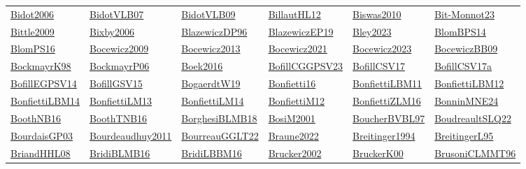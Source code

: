 \begin{longtable}{*{6}{l}}
\hyperref[detail:Bidot2006]{Bidot2006} & \hyperref[detail:BidotVLB07]{BidotVLB07} & \hyperref[detail:BidotVLB09]{BidotVLB09} & \hyperref[detail:BillautHL12]{BillautHL12} & \hyperref[detail:Biswas2010]{Biswas2010} & \hyperref[detail:Bit-Monnot23]{Bit-Monnot23}\\ 
\hyperref[detail:Bittle2009]{Bittle2009} & \hyperref[detail:Bixby2006]{Bixby2006} & \hyperref[detail:BlazewiczDP96]{BlazewiczDP96} & \hyperref[detail:BlazewiczEP19]{BlazewiczEP19} & \hyperref[detail:Bley2023]{Bley2023} & \hyperref[detail:BlomBPS14]{BlomBPS14}\\ 
\hyperref[detail:BlomPS16]{BlomPS16} & \hyperref[detail:Bocewicz2009]{Bocewicz2009} & \hyperref[detail:Bocewicz2013]{Bocewicz2013} & \hyperref[detail:Bocewicz2021]{Bocewicz2021} & \hyperref[detail:Bocewicz2023]{Bocewicz2023} & \hyperref[detail:BocewiczBB09]{BocewiczBB09}\\ 
\hyperref[detail:BockmayrK98]{BockmayrK98} & \hyperref[detail:BockmayrP06]{BockmayrP06} & \hyperref[detail:Boek2016]{Boek2016} & \hyperref[detail:BofillCGGPSV23]{BofillCGGPSV23} & \hyperref[detail:BofillCSV17]{BofillCSV17} & \hyperref[detail:BofillCSV17a]{BofillCSV17a}\\ 
\hyperref[detail:BofillEGPSV14]{BofillEGPSV14} & \hyperref[detail:BofillGSV15]{BofillGSV15} & \hyperref[detail:BogaerdtW19]{BogaerdtW19} & \hyperref[detail:Bonfietti16]{Bonfietti16} & \hyperref[detail:BonfiettiLBM11]{BonfiettiLBM11} & \hyperref[detail:BonfiettiLBM12]{BonfiettiLBM12}\\ 
\hyperref[detail:BonfiettiLBM14]{BonfiettiLBM14} & \hyperref[detail:BonfiettiLM13]{BonfiettiLM13} & \hyperref[detail:BonfiettiLM14]{BonfiettiLM14} & \hyperref[detail:BonfiettiM12]{BonfiettiM12} & \hyperref[detail:BonfiettiZLM16]{BonfiettiZLM16} & \hyperref[detail:BonninMNE24]{BonninMNE24}\\ 
\hyperref[detail:BoothNB16]{BoothNB16} & \hyperref[detail:BoothTNB16]{BoothTNB16} & \hyperref[detail:BorghesiBLMB18]{BorghesiBLMB18} & \hyperref[detail:BosiM2001]{BosiM2001} & \hyperref[detail:BoucherBVBL97]{BoucherBVBL97} & \hyperref[detail:BoudreaultSLQ22]{BoudreaultSLQ22}\\ 
\hyperref[detail:BourdaisGP03]{BourdaisGP03} & \hyperref[detail:Bourdeaudhuy2011]{Bourdeaudhuy2011} & \hyperref[detail:BourreauGGLT22]{BourreauGGLT22} & \hyperref[detail:Braune2022]{Braune2022} & \hyperref[detail:Breitinger1994]{Breitinger1994} & \hyperref[detail:BreitingerL95]{BreitingerL95}\\ 
\hyperref[detail:BriandHHL08]{BriandHHL08} & \hyperref[detail:BridiBLMB16]{BridiBLMB16} & \hyperref[detail:BridiLBBM16]{BridiLBBM16} & \hyperref[detail:Brucker2002]{Brucker2002} & \hyperref[detail:BruckerK00]{BruckerK00} & \hyperref[detail:BrusoniCLMMT96]{BrusoniCLMMT96}\\ 

\end{longtable}
